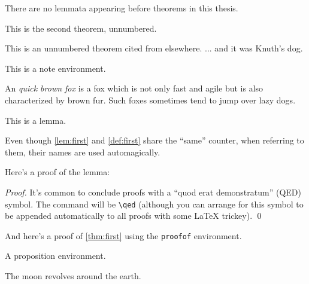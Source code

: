 \begin{corollary}
\label{cor:first}
There are no lemmata appearing before theorems in this thesis.
\end{corollary}

\begin{theorem*}
This is the second theorem, unnumbered.
\end{theorem*}

\begin{theorem*}
This is an unnumbered theorem cited from elsewhere.  ... and it was Knuth's dog.
\end{theorem*}

\begin{note}
This is a note environment.  
\end{note}

\begin{definition}
\label{def:first}
An \emph{quick brown fox} is a fox which is not only fast and agile but is also characterized by brown fur. Such foxes sometimes tend to jump over lazy dogs.
\end{definition}

\begin{lemma}
\label{lem:first}
This is a lemma. 
\end{lemma}

Even though \autoref{lem:first} and \autoref{def:first} share the ``same'' counter, when referring to them, their names are used automagically.

Here's a proof of the lemma:
\begin{proof}%
\lipsum[2]
It's common to conclude proofs with a ``quod erat demonstratum'' (QED) symbol. The command will be \verb|\qed| (although you can arrange for this symbol to be appended automatically to all proofs with some \LaTeX{} trickey). \qed
\end{proof}


And here's a proof of \autoref{thm:first} using the \verb|proofof| environment.
\begin{proofof}
\lipsum[3]
\end{proofof}

\begin{proposition}
\label{prop:first}
A proposition environment. 
\end{proposition}

\begin{observation}
\label{obs:first}
The moon revolves around the earth.
\end{observation}

